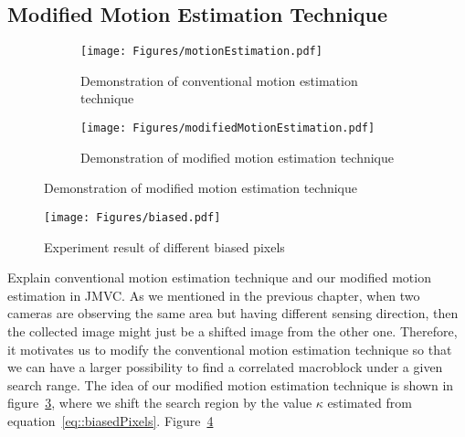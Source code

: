 \subsection{Modified Motion Estimation Technique}
%
\begin{figure}
\begin{subfigure}[b]{\columnwidth}
\begin{center}
\texttt{[image: Figures/motionEstimation.pdf]}
\caption{\label{fig::originalME}Demonstration of conventional motion estimation technique}
\end{center}
\end{subfigure}
%
\begin{subfigure}[b]{\columnwidth}
\begin{center}
\texttt{[image: Figures/modifiedMotionEstimation.pdf]}
\caption{\label{fig::modifiedME}Demonstration of modified motion estimation technique}
\end{center}
\end{subfigure}
\end{figure}
%
\begin{figure}
\begin{center}
\texttt{[image: Figures/biased.pdf]}
\caption{\label{fig::biased}Experiment result of different biased pixels}
\end{center}
\end{figure}
{\color{red} Explain conventional motion estimation technique and our modified motion estimation in JMVC.}
As we mentioned in the previous chapter, when two cameras are observing the same area but having different sensing direction, then the collected image might just be a shifted image from the other one.
Therefore, it motivates us to modify the conventional motion estimation technique so that we can have a larger possibility to find a correlated macroblock under a given search range.
The idea of our modified motion estimation technique is shown in figure~\ref{fig::modifiedME}, where we shift the search region by the value $\kappa$ estimated from equation~\eqref{eq::biasedPixels}.
Figure~\ref{fig::biased}